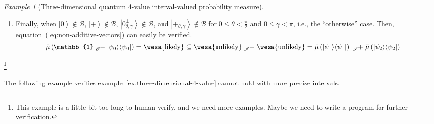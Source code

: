 \documentclass{article}
\theoremstyle{remark}
\newtheorem{example}{Example}
\newcommand{\likely}{{\mbox{\wesa{likely}}}}
\newcommand{\unlikely}{{\mbox{\wesa{unlikely}}}}
\newcommand{\ket}[1]{{\left\vert{#1}\right\rangle}}
\newcommand{\op}[2]{\ensuremath{\left\vert{#1}\middle\rangle\middle\langle{#2}\right\vert}}
\newcommand{\proj}[1]{\op{#1}{#1}}
\newcommand{\ps}{\texttt{+}}
\newcommand{\rme}{\mathrm{e}}
\newcommand{\rmi}{\mathrm{i}}
\begin{document}
\begin{example}[Three-dimensional quantum 4-value interval-valued
probability measure]
\begin{enumerate}
\begin{equation}
\begin{pmatrix}
\rme^{\rmi\left(\pi+\gamma\right)}\sin\left(\frac{\pi}{2}-\theta\right)\\
\cos\left(\frac{\pi}{2}-\theta\right)
\end{pmatrix}=\sqrt{2}\rme^{-\rmi\gamma}\ket{\ps_{\frac{\pi}{2}-\theta,\pi+\gamma}^{\perp}}\label{eq:case2-cross}
\end{equation}
Because of $0\le\theta<\frac{\pi}{2}$ and $0\le\gamma<\pi$, we have
($0<\theta'=\frac{\pi}{2}-\theta<\frac{\pi}{2}$ and $\pi\le\gamma'=\pi+\gamma<2\pi$)
or $\theta'=\frac{\pi}{2}-\theta=\frac{\pi}{2}$. Similarly, when
$\ket{\psi_{0}}$ is $\ket{\ps_{\theta,\gamma}^{\perp}}$ and $\ket{\ps}\notin\mathcal{B}$,
equation~(\ref{eq:non-additive-vectors}) holds. 
\item Finally, when $\ket{0}\notin\mathcal{B}$, $\ket{\ps}\notin\mathcal{B}$,
$\ket{0_{\theta,\gamma}^{\perp}}\notin\mathcal{B}$, and $\ket{\ps_{\theta,\gamma}^{\perp}}\notin\mathcal{B}$
for $0\le\theta<\frac{\pi}{2}$ and $0\le\gamma<\pi$, i.e., the ``otherwise''
case. Then, equation~(\ref{eq:non-additive-vectors}) can easily
be verified. 
\begin{equation}
\bar{\mu}\left(\mathbb{1}\tensor*[_{\mathscr{O}}]{-}{}\proj{\psi_{0}}\right)=\likely\subseteq\unlikely\tensor*[_{\mathscr{I}}]{+}{}\unlikely=\bar{\mu}\left(\proj{\psi_{1}}\right)\tensor*[_{\mathscr{I}}]{+}{}\bar{\mu}\left(\proj{\psi_{2}}\right)\label{eq:case3}
\end{equation}
\end{enumerate}
\footnote{This example is a little bit too long to human-verify, and
we need more examples. Maybe we need to write a program for further
verification.}
\end{example}

The following example verifies example~\ref{ex:three-dimensional-4-value}
cannot hold with more precise intervals.
\end{document}
